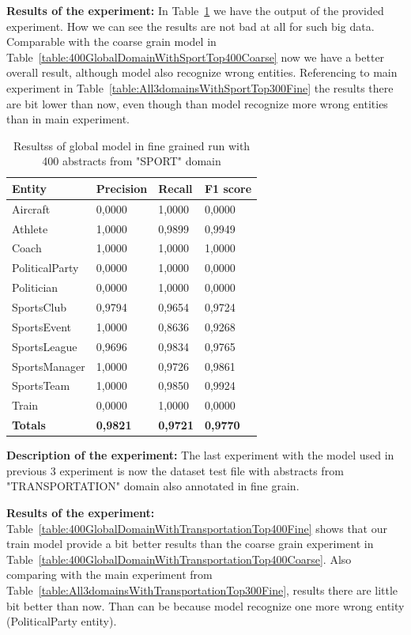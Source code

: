 \documentclass[thesis=M,english]{FITthesis}[2018/05/30]
\begin{document}
\textbf{Results of the experiment:} In Table~\ref{table:400GlobalDomainWithSportsTop400Fine} we have the output of the provided experiment. How we can see the results are not bad at all for such big data. Comparable with the coarse grain model in Table~\ref{table:400GlobalDomainWithSportTop400Coarse} now we have a better overall result, although model also recognize wrong entities. Referencing to main experiment in Table~\ref{table:All3domainsWithSportTop300Fine} the results there are bit lower than now, even though than model recognize more wrong entities than in main experiment.

	\begin{table}[H]\centering
		\begin{tabular}{|l|l|l|l|}
			\hline {\textbf{Entity}} & {\textbf{Precision}} & {\textbf{Recall}} & {\textbf{F1 score}}\\\hline
				Aircraft & 0,0000 & 1,0000 & 0,0000\\
				Athlete & 1,0000 & 0,9899 & 0,9949\\
				Coach & 1,0000 & 1,0000 & 1,0000\\
				PoliticalParty & 0,0000 & 1,0000 & 0,0000\\
				Politician & 0,0000 & 1,0000 & 0,0000\\
				SportsClub & 0,9794 & 0,9654 & 0,9724\\
				SportsEvent & 1,0000 & 0,8636 & 0,9268\\
				SportsLeague & 0,9696 & 0,9834 & 0,9765\\
				SportsManager & 1,0000 & 0,9726 & 0,9861\\				
				SportsTeam & 1,0000 & 0,9850 & 0,9924\\
				Train & 0,0000 & 1,0000 & 0,0000\\\hline
				\textbf{Totals} & \textbf{0,9821} & \textbf{0,9721} & \textbf{0,9770}\\\hline
		\end{tabular}
		\caption{Resultss of global model in fine grained run with 400 abstracts from "SPORT" domain \label{table:400GlobalDomainWithSportsTop400Fine}}
	\end{table}	


\textbf{Description of the experiment:} The last experiment with the model used in previous 3 experiment is now the dataset test file with abstracts from "TRANSPORTATION" domain also annotated in fine grain.

\textbf{Results of the experiment:} Table~\ref{table:400GlobalDomainWithTransportationTop400Fine} shows that our train model provide a bit better results than the coarse grain experiment in Table~\ref{table:400GlobalDomainWithTransportationTop400Coarse}. Also comparing with the main experiment from Table~\ref{table:All3domainsWithTransportationTop300Fine}, results there are little bit better than now. Than can be because model recognize one more wrong entity (PoliticalParty entity).
\end{document}
